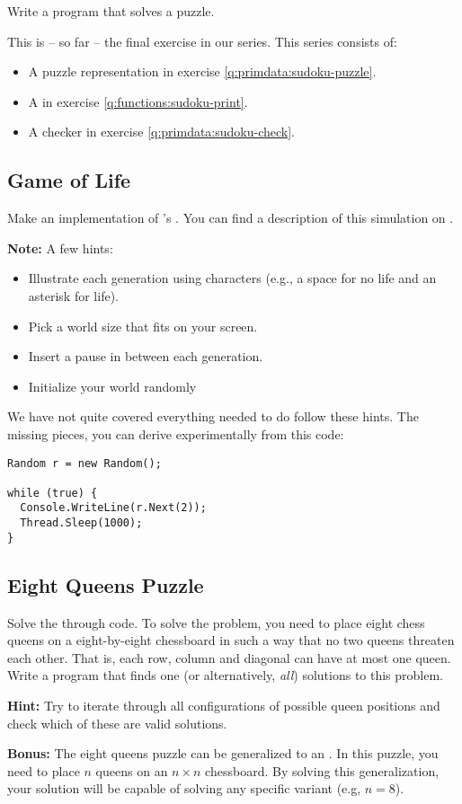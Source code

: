 Write a program that solves a puzzle.

This is -- so far -- the final exercise in our  series. This series consists of:
\begin{itemize}
  \item A puzzle representation in exercise \ref{q:primdata:sudoku-puzzle}.
  \item A  in exercise \ref{q:functions:sudoku-print}.
  \item A checker in exercise \ref{q:primdata:sudoku-check}.
\end{itemize}

\subsection{Game of Life}

Make an implementation of 's . You can find a description of this simulation on .

\textbf{Note:} A few hints:
\begin{itemize}
  \item Illustrate each generation using characters (e.g., a space for no life and an asterisk for life).
  \item Pick a world size that fits on your screen.
  \item Insert a pause in between each generation.
  \item Initialize your world randomly
\end{itemize}

We have not quite covered everything needed to do follow these hints. The missing pieces, you can derive experimentally from this code:

\begin{verbatim}
Random r = new Random();

while (true) {
  Console.WriteLine(r.Next(2));
  Thread.Sleep(1000);
}
\end{verbatim}

\subsection{Eight Queens Puzzle}

Solve the  through code. To solve the problem, you need to place eight chess queens on a eight-by-eight chessboard in such a way that no two queens threaten each other. That is, each row, column and diagonal can have at most one queen. Write a program that finds one (or alternatively, \textsl{all}) solutions to this problem.

\textbf{Hint:} Try to iterate through all configurations of possible queen positions and check which of these are valid solutions.

\textbf{Bonus:} The eight queens puzzle can be generalized to an . In this puzzle, you need to place $n$ queens on an $n \times n$ chessboard. By solving this generalization, your solution will be capable of solving any specific variant (e.g, $n=8$).

